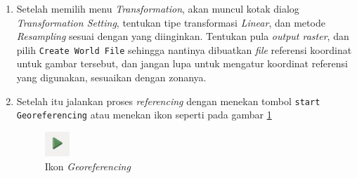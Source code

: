 \begin{enumerate}[1.]
  \item Setelah memilih menu \textit{Transformation}, akan muncul kotak dialog \textit{Transformation Setting}, tentukan tipe transformasi \textit{Linear}, dan metode \textit{Resampling} sesuai dengan yang diinginkan. Tentukan pula \textit{output raster}, dan pilih \verb|Create World File| sehingga nantinya dibuatkan \textit{file} referensi koordinat untuk gambar tersebut, dan jangan lupa untuk mengatur koordinat referensi yang digunakan, sesuaikan dengan zonanya.
  
  \item Setelah itu jalankan proses \textit{referencing} dengan menekan tombol \verb|start Georeferencing| atau menekan ikon seperti pada gambar \ref{fig:startgeoref}
  
  \begin{figure}[H]
    \centering
    \includegraphics[scale=1]{./resources/034-icon-start-georef}
    \caption{Ikon \textit{Georeferencing}}
    \label{fig:startgeoref}
  \end{figure}
  
\end{enumerate}
